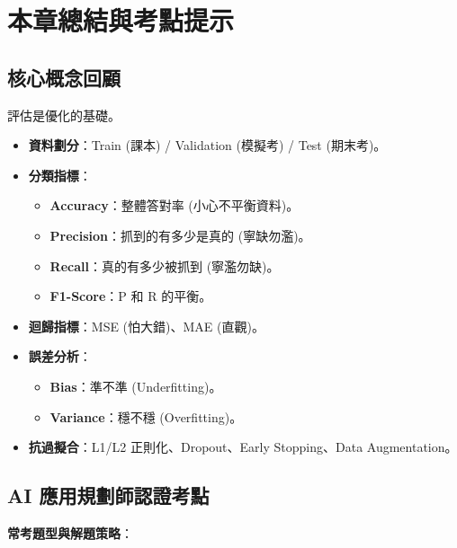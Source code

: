 \documentclass[
  letterpaper,
  DIV=11,
  numbers=noendperiod]{scrreprt}
\providecommand{\tightlist}{%
  \setlength{\itemsep}{0pt}\setlength{\parskip}{0pt}}
\begin{document}
\chapter{本章總結與考點提示}\label{sec-chapter9-summary}

\section{核心概念回顧}\label{ux6838ux5fc3ux6982ux5ff5ux56deux9867-8}

評估是優化的基礎。

\begin{itemize}
\tightlist
\item
  \textbf{資料劃分}：Train (課本) / Validation (模擬考) / Test
  (期末考)。
\item
  \textbf{分類指標}：

  \begin{itemize}
  \tightlist
  \item
    \textbf{Accuracy}：整體答對率 (小心不平衡資料)。
  \item
    \textbf{Precision}：抓到的有多少是真的 (寧缺勿濫)。
  \item
    \textbf{Recall}：真的有多少被抓到 (寧濫勿缺)。
  \item
    \textbf{F1-Score}：P 和 R 的平衡。
  \end{itemize}
\item
  \textbf{迴歸指標}：MSE (怕大錯)、MAE (直觀)。
\item
  \textbf{誤差分析}：

  \begin{itemize}
  \tightlist
  \item
    \textbf{Bias}：準不準 (Underfitting)。
  \item
    \textbf{Variance}：穩不穩 (Overfitting)。
  \end{itemize}
\item
  \textbf{抗過擬合}：L1/L2 正則化、Dropout、Early Stopping、Data
  Augmentation。
\end{itemize}

\section{AI
應用規劃師認證考點}\label{ai-ux61c9ux7528ux898fux5283ux5e2bux8a8dux8b49ux8003ux9ede-8}

\textbf{常考題型與解題策略}：
\end{document}
